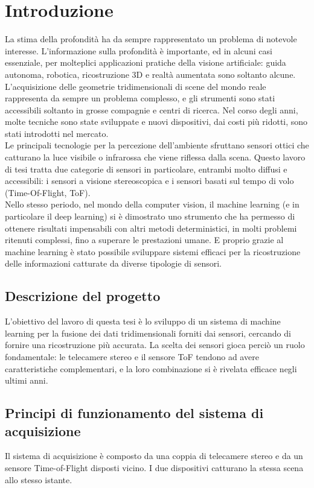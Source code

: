 \chapter{Introduzione}  
La stima della profondità ha da sempre rappresentato un problema di notevole interesse. L'informazione sulla profondità è importante, ed in alcuni casi essenziale, per molteplici applicazioni pratiche della visione artificiale: guida autonoma, robotica, ricostruzione 3D e realtà aumentata sono soltanto alcune. \\
L'acquisizione delle geometrie tridimensionali di scene del mondo reale rappresenta da sempre un problema complesso, e gli strumenti sono stati accessibili soltanto in grosse compagnie e centri di ricerca. Nel corso degli anni, molte tecniche sono state sviluppate e nuovi dispositivi, dai costi più ridotti, sono stati introdotti nel mercato.\\
Le principali tecnologie per la percezione dell'ambiente sfruttano sensori ottici che catturano la luce visibile o infrarossa che viene riflessa dalla scena. Questo lavoro di tesi tratta due categorie di sensori in particolare, entrambi molto diffusi e accessibili: i sensori a visione stereoscopica e i sensori basati sul tempo di volo (Time-Of-Flight, ToF).\\
Nello stesso periodo, nel mondo della computer vision, il machine learning (e in particolare il deep learning) si è dimostrato uno strumento che ha permesso di ottenere risultati impensabili con altri metodi deterministici, in molti problemi ritenuti complessi, fino a superare le prestazioni umane. E proprio grazie al machine learning è stato possibile sviluppare sistemi efficaci per la ricostruzione delle informazioni catturate da diverse tipologie di sensori.

\section{Descrizione del progetto}
L'obiettivo del lavoro di questa tesi è lo sviluppo di un sistema di machine learning per la fusione dei dati tridimensionali forniti dai sensori, cercando di fornire una ricostruzione più accurata. La scelta dei sensori gioca perciò un ruolo fondamentale: le telecamere stereo e il sensore ToF tendono ad avere caratteristiche complementari, e la loro combinazione si è rivelata efficace negli ultimi anni. 

\section{Principi di funzionamento del sistema di acquisizione}
Il sistema di acquisizione è composto da una coppia di telecamere stereo e da un sensore Time-of-Flight disposti vicino. I due dispositivi catturano la stessa scena allo stesso istante.

